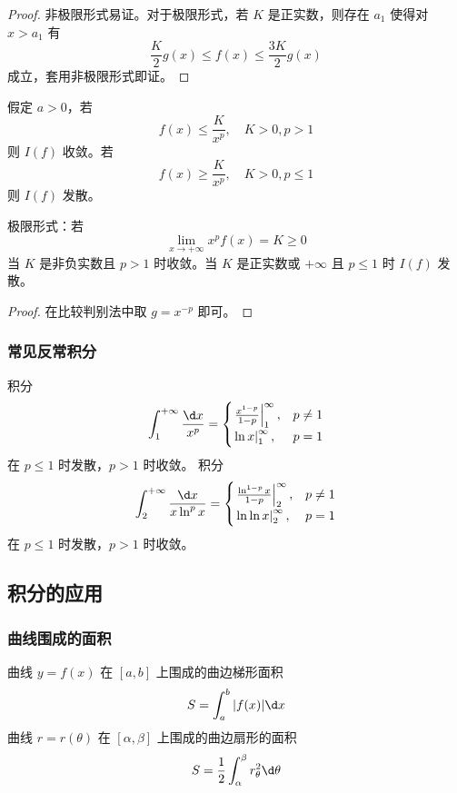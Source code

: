 \begin{proof}
	非极限形式易证。对于极限形式，若 $K$ 是正实数，则存在 $a_1$ 使得对 $x > a_1$ 有
	\[ \frac{K}{2} g(x) \leqslant f(x) \leqslant \frac{3K}{2} g(x) \]
	成立，套用非极限形式即证。
\end{proof}

\begin{theorem}
	假定 $a > 0$，若
	\[ f(x) \leqslant \frac{K}{x^p}, \quad K > 0, p > 1 \]
	则 $I(f)$ 收敛。若
	\[ f(x) \geqslant \frac{K}{x^p}, \quad K > 0, p \leqslant 1 \]
	则 $I(f)$ 发散。

	极限形式：若
	\[ \lim_{x \to +\infty} x^p f(x) = K \geqslant 0 \]
	当 $K$ 是非负实数且 $p > 1$ 时收敛。当 $K$ 是正实数或 $+\infty$ 且 $p \leqslant 1$ 时 $I(f)$ 发散。
\end{theorem}

\begin{proof}
	在比较判别法中取 $g = x^{-p}$ 即可。
\end{proof}

\subsubsection*{常见反常积分}

积分
\[ \int_{1}^{+\infty} \frac{\d x}{x^p} = \begin{cases}
	\left.\frac{x^{1-p}}{1-p}\right|_{1}^{\infty}, &p \neq 1 \\
	\left.\ln  x\right|_{1}^{\infty}, & p = 1
\end{cases} \]
在 $p \leqslant 1$ 时发散，$p>1$ 时收敛。
积分
\[ \int_{2}^{+\infty} \frac{\d x}{x \ln^p x} = \begin{cases}
	\left.\frac{\ln^{1-p} x}{1 - p}\right|_{2}^{\infty}, &p \neq 1 \\
	\left.\ln \ln x\right|_{2}^{\infty}, & p = 1
\end{cases} \]
在 $p \leqslant 1$ 时发散，$p > 1$ 时收敛。

\subsection{积分的应用}

\subsubsection*{曲线围成的面积}

曲线 $y = f(x)$ 在 $[a, b]$ 上围成的曲边梯形面积
\[ S = \int_{a}^{b} |f(x)| \d x \]
曲线 $r = r(\theta)$ 在 $[\alpha, \beta]$ 上围成的曲边扇形的面积
\[ S = \frac{1}{2} \int_{\alpha}^{\beta} r_{\theta}^2 \d \theta \]

